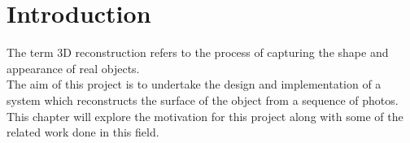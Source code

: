 \documentclass[12pt,a4paper,twoside,openright]{report}
\begin{document}
\bigskip
{}

\medskip
{}

\tableofcontents

\listoffigures

\newpage


\pagestyle{headings}

\chapter{Introduction}
The term 3D reconstruction refers to the process of capturing the shape and appearance of real objects.\\
The aim of this project is to undertake the design and implementation of a system which reconstructs the surface of the object from a sequence of photos.\\
\linebreak
This chapter will explore the motivation for this project along with some of the related work done in this field. 
\end{document}
